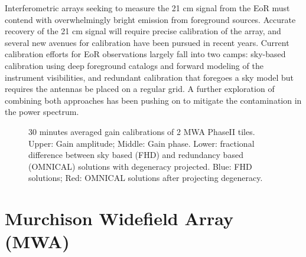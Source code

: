 \documentclass[a0,landscape]{a0poster}
\begin{document}
\begin{multicols}{4}
Interferometric arrays seeking to measure the 21 cm signal from the EoR must contend with overwhelmingly bright emission from foreground sources. Accurate recovery of the 21 cm signal will require precise calibration of the array, and several new avenues for calibration have been pursued in recent years. Current calibration efforts for EoR observations largely fall into two camps:  sky-based calibration using deep foreground catalogs and forward modeling of the instrument visibilities, and redundant calibration that foregoes a sky model but requires the antennas be placed on a regular grid. A further exploration of combining both approaches has been pushing on to mitigate the contamination in the power spectrum.
\begin{figure}[H]
\centering
\label{comparison_between_sky_and_redundant}
\caption{30 minutes averaged gain calibrations of 2 MWA PhaseII tiles. Upper: Gain amplitude; Middle: Gain phase. Lower: fractional difference between sky based (FHD) and redundancy based (OMNICAL) solutions with degeneracy projected. Blue: FHD solutions; Red: OMNICAL solutions after projecting degeneracy.}
\end{figure}



\section*{Murchison Widefield Array (MWA)}


\end{multicols}
\end{document}
